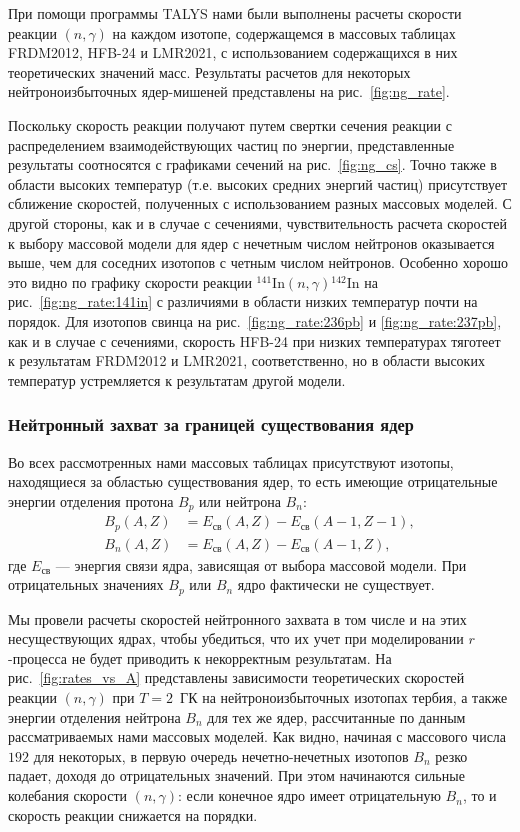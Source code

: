 При помощи программы TALYS нами были выполнены расчеты скорости реакции $(n,\gamma)$ на каждом изотопе, содержащемся в массовых таблицах FRDM2012, HFB-24 и LMR2021, с использованием содержащихся в них теоретических значений масс. Результаты расчетов для некоторых нейтроноизбыточных ядер-мишеней представлены на рис.~\ref{fig:ng_rate}. 

Поскольку скорость реакции получают путем свертки сечения реакции с распределением взаимодействующих частиц по энергии, представленные результаты соотносятся с графиками сечений на рис.~\ref{fig:ng_cs}. Точно также в области высоких температур (т.е. высоких средних энергий частиц) присутствует сближение скоростей, полученных с использованием разных массовых моделей. С другой стороны, как и в случае с сечениями, чувствительность расчета скоростей к выбору массовой модели для ядер с нечетным числом нейтронов оказывается выше, чем для соседних изотопов с четным числом нейтронов. Особенно хорошо это видно по графику скорости реакции ${}^{141}\text{In}(n,\gamma){}^{142}\text{In}$ на рис.~\ref{fig:ng_rate:141in} с различиями в области низких температур почти на порядок. Для изотопов свинца на рис.~\ref{fig:ng_rate:236pb} и \ref{fig:ng_rate:237pb}, как и в случае с сечениями, скорость HFB-24 при низких температурах тяготеет к результатам FRDM2012 и LMR2021, соответственно, но в области высоких температур устремляется к результатам другой модели.

\subsubsection{Нейтронный захват за границей существования ядер}
Во всех рассмотренных нами массовых таблицах присутствуют изотопы, находящиеся за областью существования ядер, то есть имеющие отрицательные энергии отделения протона $B_p$ или нейтрона $B_n$:
\begin{equation}\begin{aligned}\label{eq:driplines}
B_p(A,Z) &= E_{\text{св}}(A,Z) - E_{\text{св}}(A-1,Z-1),\\
B_n(A,Z) &= E_{\text{св}}(A,Z) - E_{\text{св}}(A-1,Z),
\end{aligned}\end{equation}
где $E_{\text{св}}$ --- энергия связи ядра, зависящая от выбора массовой модели. При отрицательных значениях $B_p$ или $B_n$ ядро фактически не существует. 

Мы провели расчеты скоростей нейтронного захвата в том числе и на этих несуществующих ядрах, чтобы убедиться, что их учет при моделировании $r$-процесса не будет приводить к некорректным результатам. На рис.~\ref{fig:rates_vs_A} представлены зависимости теоретических скоростей реакции $(n,\gamma)$ при $T = 2$~ГК на нейтроноизбыточных изотопах тербия, а также энергии отделения нейтрона $B_n$ для тех же ядер, рассчитанные по данным рассматриваемых нами массовых моделей. Как видно, начиная с массового числа $192$ для некоторых, в первую очередь нечетно-нечетных изотопов $B_n$ резко падает, доходя до отрицательных значений. При этом начинаются сильные колебания скорости $(n,\gamma)$: если конечное ядро имеет отрицательную $B_n$, то и скорость реакции снижается на порядки. 

